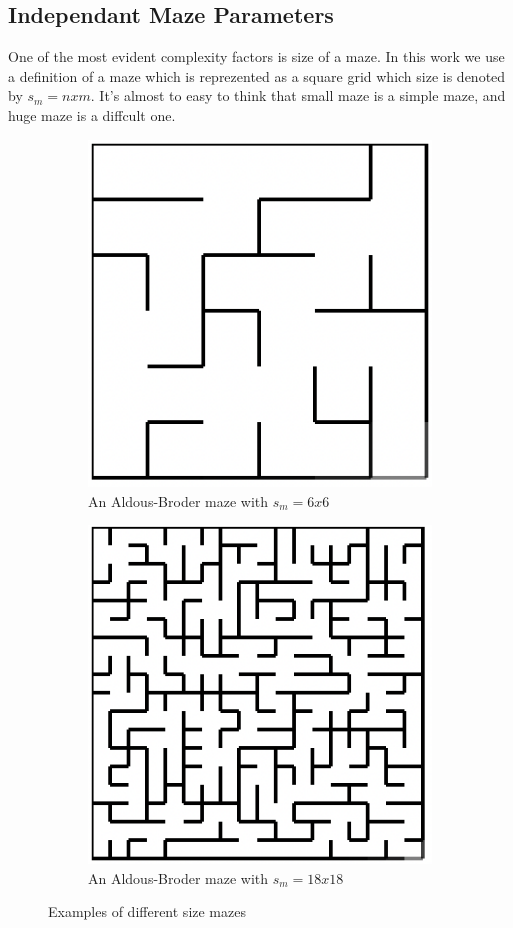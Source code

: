 \subsection{Independant Maze Parameters}
\begin{description}[style=unboxed]
    \item[Size] One of the most evident complexity factors is size of a maze. In this work we use a definition of a maze which is reprezented as a square grid which size is denoted by $s_m = nxm$. It's almost to easy to think that small maze is a simple maze, and huge maze is a diffcult one.
    \begin{figure}[!h]
        \centering
        \begin{subfigure}{.5\textwidth}
          \centering
          \includegraphics[width=.5\linewidth]{66}
          \caption{An Aldous-Broder maze with $s_m = 6x6$}
          \label{fig:sub1}
        \end{subfigure}%
        \begin{subfigure}{.5\textwidth}
          \centering
          \includegraphics[width=.5\linewidth]{1818}
          \caption{An Aldous-Broder maze with $s_m = 18x18$}
          \label{fig:sub2}
        \end{subfigure}
        \caption{Examples of different size mazes}

\end{figure}
\end{description}

